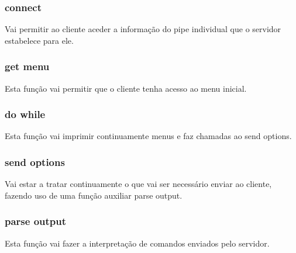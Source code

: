 \documentclass{article}
\begin{document}
\subsubsection{connect}
\label{sec:org5859cbe}

Vai permitir ao cliente aceder a informação do pipe individual que o servidor estabelece para ele.

\subsubsection{get menu}
\label{sec:org154afbc}

Esta função vai permitir que o cliente tenha acesso ao menu inicial.

\subsubsection{do while}
\label{sec:org053cdf9}

Esta função vai imprimir continuamente menus e faz chamadas ao send options.

\subsubsection{send options}
\label{sec:orgabf89f1}

Vai estar a tratar continuamente o que vai ser necessário enviar ao cliente, fazendo uso de uma função auxiliar parse output.

\subsubsection{parse output}
\label{sec:org747d66f}

Esta função vai fazer a interpretação de comandos enviados pelo servidor.
\end{document}
